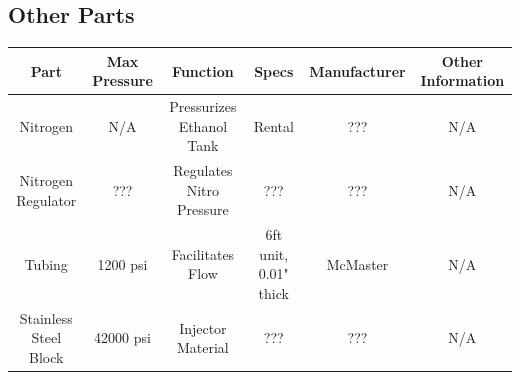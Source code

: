 \documentclass[9pt]{article} %
\numberwithin{equation}{section} %
\begin{document}
\subsection{Other Parts}
\begin{center}
 \begin{tabular}{||c c c c c c||} 
 \hline
 Part & Max Pressure & Function & Specs & Manufacturer & Other Information\\
 \hline\hline
 Nitrogen & N/A & Pressurizes Ethanol Tank & Rental & ??? & N/A\\ 
 \hline
 Nitrogen Regulator & ??? & Regulates Nitro Pressure & ??? & ??? & N/A\\
 \hline
 Tubing & 1200 psi & Facilitates Flow & 6ft unit, 0.01" thick & McMaster & N/A\\
 \hline
 Stainless Steel Block & 42000 psi & Injector Material & ??? & ??? & N/A\\ [0.5ex]
 \hline
\end{tabular}
\end{center}
\end{document}
